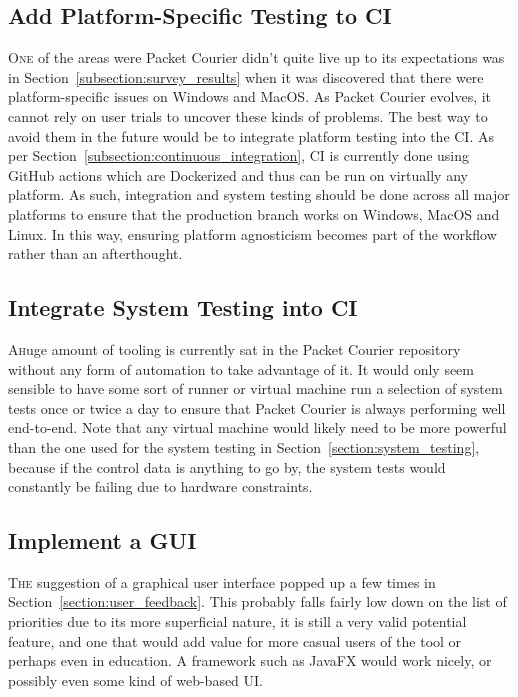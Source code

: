 \newpage

\subsection{Add Platform-Specific Testing to CI}\label{subsection:add_platform_specific_testing_to_ci}

\lettrine{O}{ne} of the areas were Packet Courier didn't quite live up to its expectations was in
Section~\ref{subsection:survey_results} when it was discovered that there were platform-specific issues on Windows
and MacOS. As Packet Courier evolves, it cannot rely on user trials to uncover these kinds of problems. The best way
to avoid them in the future would be to integrate platform testing into the CI. As per
Section~\ref{subsection:continuous_integration}, CI is currently done using GitHub actions which are
Dockerized\cite{dockerizing} and thus can be run on virtually any platform. As such, integration and system testing
should be done across all major platforms to ensure that the production branch works on Windows, MacOS and Linux. In
this way, ensuring platform agnosticism becomes part of the workflow rather than an afterthought.

\subsection{Integrate System Testing into CI}\label{subsection:integrate_system_testing_into_ci}

\lettrine{A} huge amount of tooling is currently sat in the Packet Courier repository without any form of automation
to take advantage of it. It would only seem sensible to have some sort of runner or virtual machine run a selection
of system tests once or twice a day to ensure that Packet Courier is always performing well end-to-end. Note that any
virtual machine would likely need to be more powerful than the one used for the system testing in
Section~\ref{section:system_testing}, because if the control data is anything to go by, the system tests would
constantly be failing due to hardware constraints.

\subsection{Implement a GUI}\label{subsection:implement_gui}

\lettrine{T}{he} suggestion of a graphical user interface popped up a few times in Section~\ref{section:user_feedback}.
This probably falls fairly low down on the list of priorities due to its more superficial nature, it is still a very
valid potential feature, and one that would add value for more casual users of the tool or perhaps even in education.
A framework such as JavaFX\cite{java_fx} would work nicely, or possibly even some kind of web-based UI.

